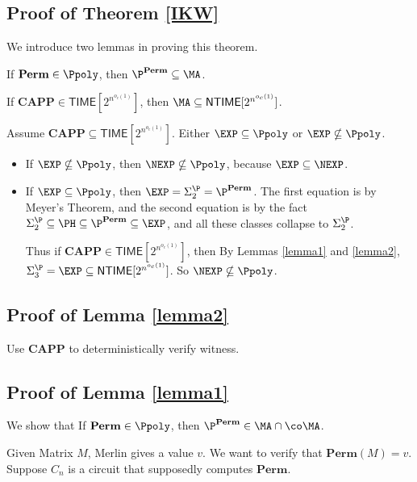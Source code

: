 \documentclass[letterpaper, 12pt]{article}
\newcommand{\Perm}{\mathbf{Perm}}
\newcommand{\CAPP}{\mathbf{CAPP}}
\newcommand{\Time}[1]{\mathsf{TIME}[#1]}
\newcommand{\NTime}[1]{\mathsf{NTIME}[#1]}
\begin{document}
\subsection{Proof of Theorem \ref{IKW}} %

We introduce two lemmas in proving this theorem.

\begin{lemma} \label{lemma1}
	If $\Perm \in \Ppoly$, then $\P^\Perm \subseteq \MA$.
\end{lemma}

\begin{lemma} \label{lemma2}
	If $\CAPP \in \Time{2^{n^{o_c(1)}}}$, then $\MA \subseteq \NTime{2^{n^{o_c(1)}}}$.
\end{lemma}

	Assume $\CAPP \subseteq \Time{2^{n^{o_c(1)}}}$. Either $\EXP \subseteq \Ppoly$ or $\EXP \nsubseteq \Ppoly$.
	\begin{itemize}
		\item If $\EXP \nsubseteq \Ppoly$, then $\NEXP \nsubseteq \Ppoly$, because $\EXP \subseteq \NEXP$.
		\item If $\EXP \subseteq \Ppoly$, then $\EXP = \Sigma_2^\P = \P^\Perm$. The first equation is by Meyer's Theorem, and the second equation is by the fact $\Sigma_2^\P \subseteq \PH \subseteq \P^\Perm \subseteq \EXP$, and all these classes collapse to $\Sigma_2^\P$.
		
		Thus if $\CAPP \in \Time{2^{n^{o_c(1)}}}$, then By Lemmas \ref{lemma1} and \ref{lemma2}, $\Sigma_3^\P = \EXP \subseteq \NTime{2^{n^{o_c(1)}}}$. So $\NEXP \nsubseteq \Ppoly$.
	\end{itemize}





\subsection{Proof of Lemma \ref{lemma2}}

Use $\CAPP$ to deterministically verify witness.

\subsection{Proof of Lemma \ref{lemma1}}
We show that If $\Perm \in \Ppoly$, then $\P^\Perm \in \MA \cap \co \MA$.

Given Matrix $M$, Merlin gives a value $v$. We want to verify that $\Perm(M) = v$.
Suppose $C_n$ is a circuit that supposedly computes $\Perm$.
\end{document}
